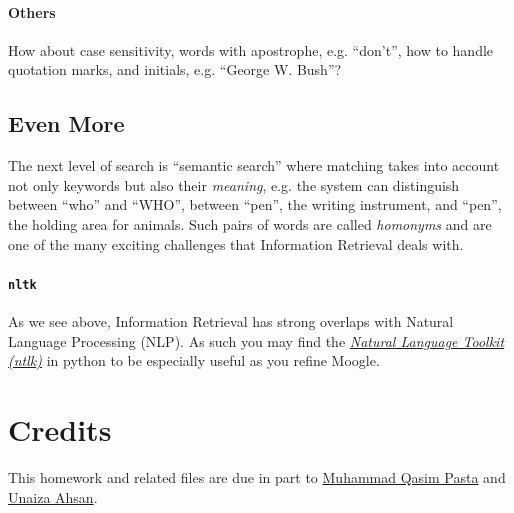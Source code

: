 \documentclass[addpoints]{exam}
\begin{document}
\paragraph{Others} How about case sensitivity, words with apostrophe, e.g. ``don't'', how to handle quotation marks, and initials, e.g. ``George W. Bush''?

\subsection{Even More} The next level of search is ``semantic search'' where matching takes into account not only keywords but also their \textit{meaning}, e.g. the system can distinguish between ``who'' and ``WHO'', between ``pen'', the writing instrument, and ``pen'', the holding area for animals. Such pairs of words are called \textit{homonyms} and are one of the many exciting challenges that Information Retrieval deals with.

\paragraph{\texttt{nltk}} As we see above, Information Retrieval has strong overlaps with Natural Language Processing (NLP). As such you may find the \href{https://www.nltk.org}{\textit{Natural Language Toolkit (ntlk)}} in python to be especially useful as you refine Moogle.

\section*{Credits}

This homework and related files are due in part to \href{https://mqpasta.github.io/}{Muhammad Qasim Pasta} and \href{http://unaizahsan.com}{Unaiza Ahsan}.
\end{document}
